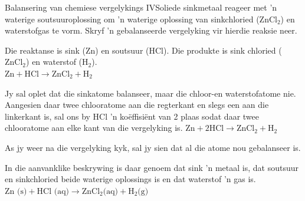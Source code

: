      \noindent
\begin{wex}{Balansering van chemiese vergelykings IV}{Soliede sinkmetaal reageer met  'n waterige soutsuuroplossing om 'n waterige oplossing van  sinkchloried ($\text{ZnCl}_{2}$) en waterstofgas te vorm. Skryf 'n gebalanseerde vergelyking vir hierdie reaksie neer.}{
Die reaktanse is sink ($\text{Zn}$) en soutsuur ($\text{HCl}$). Die produkte is sink chloried ($\text{ZnCl}_{2}$) en waterstof ($\text{H}_{2}$).\\


${\text{Zn} + \text{HCl} \rightarrow \text{ZnCl}_{2} + \text{H}_{2}}$


Jy sal oplet dat die sinkatome balanseer, maar die chloor-en waterstofatome nie. Aangesien daar twee chlooratome aan die regterkant en slegs een aan die linkerkant is, sal ons by HCl 'n ko\"{e}ffisiënt van 2 plaas sodat daar twee chlooratome aan elke kant van die  vergelyking is.
${\text{Zn} + 2\text{HCl} \rightarrow \text{ZnCl}_{2} + \text{H}_{2}}$


 As jy weer na die vergelyking kyk, sal jy sien dat al die atome nou gebalanseer is.


In die aanvanklike beskrywing is daar genoem dat sink 'n metaal is, dat soutsuur en sinkchloried beide waterige oplossings is  en dat waterstof 'n gas is.
$\text{Zn (s)} + \text{HCl (aq)} \rightarrow \text{ZnCl}_{2} \text{(aq)} + \text{H}_{2} \text{(g)}$
}
\end{wex}
    \noindent
\par


